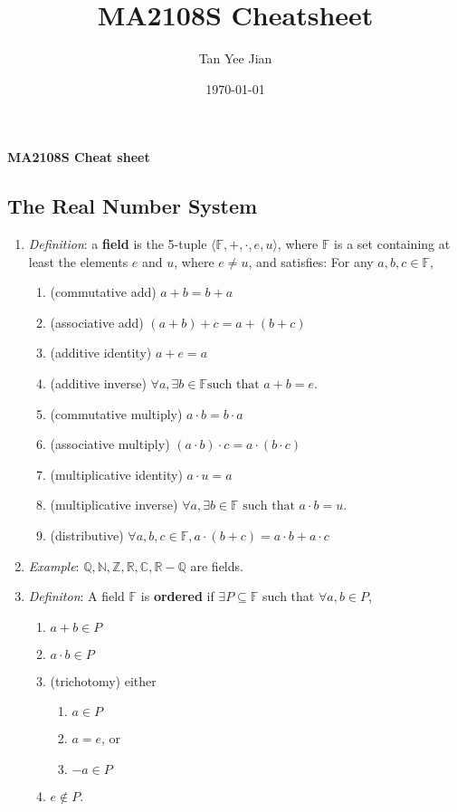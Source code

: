 \message{ !name(cheatsheet.tex)}\documentclass{article}
\title{MA2108S Cheatsheet}
\author{Tan Yee Jian}
\date{\today}
\begin{document}


\begin{center}
	{\textbf{MA2108S Cheat sheet}}
\end{center}

\begin{multicols*}{3}
	\section{The Real Number System}
	\begin{enumerate}
		\item \emph{Definition}: a \textbf{field} is the 5-tuple
		      \(\langle\mathbb{F},+,\cdot,e,u\rangle\), where \(\mathbb{F}\) is a
		      set containing at least the elements $e$ and $u$, where $e\neq u$,
		      and satisfies: For any $a,b,c\in\mathbb{F}$,
		      \begin{enumerate}
			      \item (commutative add) $a+b=b+a$
			      \item (associative add) $(a+b)+c=a+(b+c)$
			      \item (additive identity) $a+e=a$
			      \item (additive inverse) $\forall a,\exists b\in\mathbb{F}\text{
					            such that } a+b=e.$
			      \item (commutative multiply) $a\cdot b=b\cdot a$
			      \item (associative multiply) $(a\cdot b)\cdot c=a\cdot (b\cdot c)$
			      \item (multiplicative identity) $a\cdot u=a$
			      \item (multiplicative inverse) $\forall a,\exists b\in\mathbb{F}
				            \text{ such that } a\cdot b=u.$
			      \item (distributive) $\forall a,b,c\in\mathbb{F},
				            a\cdot(b+c)=a\cdot b+a\cdot c$
		      \end{enumerate}

		\item \emph{Example}: $\mathbb{Q}, \mathbb{N}, \mathbb{Z}, \mathbb{R},
			      \mathbb{C}, \mathbb{R} -\mathbb{Q} $ are fields.
		\item \emph{Definiton}: A field $\mathbb{F}$ is \textbf{ordered} if $\exists
			      P\subseteq \mathbb{F}$ such that $\forall a,b\in P$,
		      \begin{enumerate}
			      \item $a+b\in P$
			      \item $a\cdot b\in P$
			      \item (trichotomy) either
			            \begin{enumerate}
				            \item $a\in P$
				            \item $a=e$, or
				            \item $-a\in P$
			            \end{enumerate}
			      \item $e\notin P$.
		      \end{enumerate}


\end{enumerate}
\end{multicols*}
\end{document}
